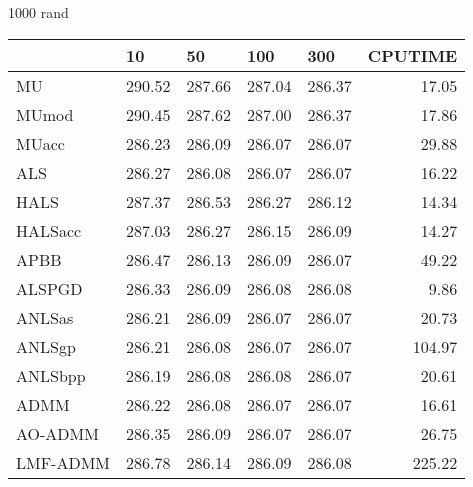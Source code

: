 \documentclass{article}
\begin{document}
1000 rand
\begin{table}[H]
	\centering
	\begin{tabular}{|l|r|r|r|r|r|}
		\hline
		& \multicolumn{1}{l|}{10} & \multicolumn{1}{l|}{50} & \multicolumn{1}{l|}{100} & \multicolumn{1}{l|}{300} & \multicolumn{1}{l|}{CPUTIME} \\ \hline
		MU       & 290.52                  & 287.66                  & 287.04                   & 286.37                   & 17.05                        \\ \hline
		MUmod    & 290.45                  & 287.62                  & 287.00                   & 286.37                   & 17.86                        \\ \hline
		MUacc    & 286.23                  & 286.09                  & 286.07                   & 286.07                   & 29.88                        \\ \hline
		ALS      & 286.27                  & 286.08                  & 286.07                   & 286.07                   & 16.22                        \\ \hline
		HALS     & 287.37                  & 286.53                  & 286.27                   & 286.12                   & 14.34                        \\ \hline
		HALSacc  & 287.03                  & 286.27                  & 286.15                   & 286.09                   & 14.27                        \\ \hline
		APBB     & 286.47                  & 286.13                  & 286.09                   & 286.07                   & 49.22                        \\ \hline
		ALSPGD   & 286.33                  & 286.09                  & 286.08                   & 286.08                   & 9.86                         \\ \hline
		ANLSas   & 286.21                  & 286.09                  & 286.07                   & 286.07                   & 20.73                        \\ \hline
		ANLSgp   & 286.21                  & 286.08                  & 286.07                   & 286.07                   & 104.97                       \\ \hline
		ANLSbpp  & 286.19                  & 286.08                  & 286.08                   & 286.07                   & 20.61                        \\ \hline
		ADMM     & 286.22                  & 286.08                  & 286.07                   & 286.07                   & 16.61                        \\ \hline
		AO-ADMM  & 286.35                  & 286.09                  & 286.07                   & 286.07                   & 26.75                        \\ \hline
		LMF-ADMM & 286.78                  & 286.14                  & 286.09                   & 286.08                   & 225.22                       \\ \hline
	\end{tabular}
\end{table}
\end{document}
